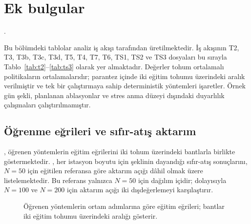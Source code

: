 \section{Ek bulgular}\label{sec:results-supp}

.

Bu bölümdeki tablolar analiz iş akışı tarafından üretilmektedir.
İş akışının T2, T3, T3b, T3c, T3d, T5, T4, T7, T6, TS1, TS2 ve TS3 dosyaları bu sırayla Tablo~\ref{tab:t2}--\ref{tab:ts3} olarak yer almaktadır.
Değerler tohum ortalamalı politikaların ortalamalarıdır; parantez içinde iki eğitim tohumu üzerindeki aralık verilmiştir ve \dag{} tek bir çalıştırmaya sahip deterministik yöntemleri işaretler.
Örnek gün şekli, planlanan ablasyonlar ve stres anma düzeyi dışındaki duyarlılık çalışmaları çalıştırılmamıştır.

\subsection{Öğrenme eğrileri ve sıfır-atış aktarım}\label{app:res-tables}

, öğrenen yöntemlerin eğitim eğrilerini iki tohum üzerindeki bantlarla birlikte göstermektedir.
, her istasyon boyutu için  şeklinin dayandığı sıfır-atış sonuçlarını, $N=50$ için eğitilen referansa göre aktarım açığı dâhil olmak üzere listelemektedir.
Bu referans yalnızca $N=50$ için dağılım içidir; dolayısıyla $N=100$ ve $N=200$ için aktarım açığı iki dışdeğerlemeyi karşılaştırır.

\begin{figure}[t]
\centering
{}
\caption{Öğrenen yöntemlerin ortam adımlarına göre eğitim eğrileri; bantlar iki eğitim tohumu üzerindeki aralığı gösterir.}
\label{fig:curves}
\end{figure}


